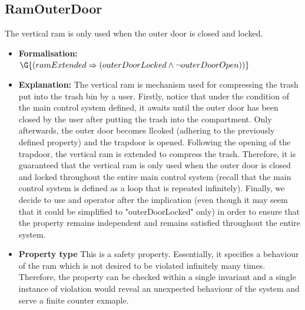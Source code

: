 \subsection{RamOuterDoor}
The vertical ram is only used when the outer door is closed and locked.
\begin{itemize}
	\item \textbf{Formalisation:} $\G{(ramExtended \Rightarrow (outerDoorLocked \wedge \neg outerDoorOpen))}$
	\item \textbf{Explanation:} The vertical ram is mechanism used for compressing the trash put into the trash bin by a user. Firstly, notice that under the condition of the main control system defined, it awaits until the outer door has been closed by the user after putting the trash into the compartment. Only afterwards, the outer door becomes llcoked (adhering to the previously defined property) and the trapdoor is opened. Following the opening of the trapdoor, the vertical ram is extended to compress the trash. Therefore, it is guaranteed that the vertical ram is only used when the outer door is closed and locked throughout the entire main control system (recall that the main control system is defined as a loop that is repeated infinitely). Finally, we decide to use and operator after the implication (even though it may seem that it could be simplified to "outerDoorLocked" only) in order to ensure that the property remains independent and remains satisfied throughout the entire system.
	\item \textbf{Property type} This is a safety property. Essentially, it specifies a behaviour of the ram which is not desired to be violated infinitely many times. Therefore, the property can be checked within a single invariant and a single instance of violation would reveal an unexpected behaviour of the system and serve a finite counter exmaple.
\end{itemize}
